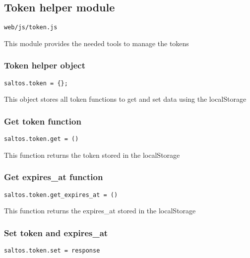 \documentclass[a4paper]{article}
\begin{document}
\hypertarget{toc855}{}
\subsection{Token helper module}

\begin{lstlisting}
web/js/token.js
\end{lstlisting}

This module provides the needed tools to manage the tokens

\hypertarget{toc856}{}
\subsubsection{Token helper object}

\begin{lstlisting}
saltos.token = {};
\end{lstlisting}

This object stores all token functions to get and set data using the localStorage

\hypertarget{toc857}{}
\subsubsection{Get token function}

\begin{lstlisting}
saltos.token.get = ()
\end{lstlisting}

This function returns the token stored in the localStorage

\hypertarget{toc858}{}
\subsubsection{Get expires\_at function}

\begin{lstlisting}
saltos.token.get_expires_at = ()
\end{lstlisting}

This function returns the expires\_at stored in the localStorage

\hypertarget{toc859}{}
\subsubsection{Set token and expires\_at}

\begin{lstlisting}
saltos.token.set = response
\end{lstlisting}
\end{document}
